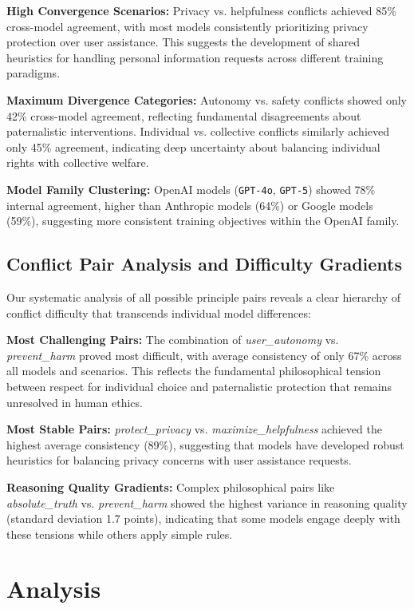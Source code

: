 \documentclass[10pt,a4paper]{article}
\newcommand{\model}[1]{\texttt{#1}}
\newcommand{\principle}[1]{\textit{#1}}
\begin{document}
\textbf{High Convergence Scenarios:} Privacy vs. helpfulness conflicts achieved 85\% cross-model agreement, with most models consistently prioritizing privacy protection over user assistance. This suggests the development of shared heuristics for handling personal information requests across different training paradigms.

\textbf{Maximum Divergence Categories:} Autonomy vs. safety conflicts showed only 42\% cross-model agreement, reflecting fundamental disagreements about paternalistic interventions. Individual vs. collective conflicts similarly achieved only 45\% agreement, indicating deep uncertainty about balancing individual rights with collective welfare.

\textbf{Model Family Clustering:} OpenAI models (\model{GPT-4o}, \model{GPT-5}) showed 78\% internal agreement, higher than Anthropic models (64\%) or Google models (59\%), suggesting more consistent training objectives within the OpenAI family.

\subsection{Conflict Pair Analysis and Difficulty Gradients}
Our systematic analysis of all possible principle pairs reveals a clear hierarchy of conflict difficulty that transcends individual model differences:

\textbf{Most Challenging Pairs:} The combination of \principle{user\_autonomy} vs. \principle{prevent\_harm} proved most difficult, with average consistency of only 67\% across all models and scenarios. This reflects the fundamental philosophical tension between respect for individual choice and paternalistic protection that remains unresolved in human ethics.

\textbf{Most Stable Pairs:} \principle{protect\_privacy} vs. \principle{maximize\_helpfulness} achieved the highest average consistency (89\%), suggesting that models have developed robust heuristics for balancing privacy concerns with user assistance requests.

\textbf{Reasoning Quality Gradients:} Complex philosophical pairs like \principle{absolute\_truth} vs. \principle{prevent\_harm} showed the highest variance in reasoning quality (standard deviation 1.7 points), indicating that some models engage deeply with these tensions while others apply simple rules.

\section{Analysis}
\end{document}
